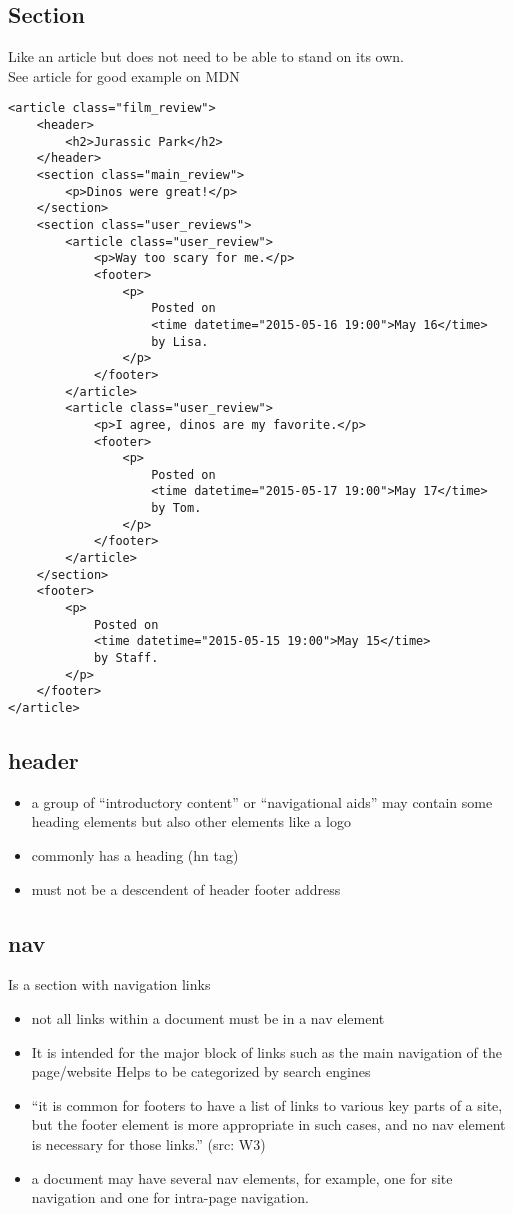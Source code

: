 \documentclass[]{article}
\newcommand{\<}{\guilsinglleft}
\renewcommand{\>}{\guilsinglright}
\begin{document}
\subsection{Section}
Like an article but does not need to be able to stand on its own.
\\
See article for good example on MDN
\begin{lstlisting}
<article class="film_review">
	<header>
		<h2>Jurassic Park</h2>
	</header>
	<section class="main_review">
		<p>Dinos were great!</p>
	</section>
	<section class="user_reviews">
		<article class="user_review">
			<p>Way too scary for me.</p>
			<footer>
				<p>
					Posted on
					<time datetime="2015-05-16 19:00">May 16</time>
					by Lisa.
				</p>
			</footer>
		</article>
		<article class="user_review">
			<p>I agree, dinos are my favorite.</p>
			<footer>
				<p>
					Posted on
					<time datetime="2015-05-17 19:00">May 17</time>
					by Tom.
				</p>
			</footer>
		</article>
	</section>
	<footer>
		<p>
			Posted on
			<time datetime="2015-05-15 19:00">May 15</time>
			by Staff.
		</p>
	</footer>
</article>
\end{lstlisting}

\subsection{header}
\begin{itemize}
	\item a group of “introductory content” or “navigational aids”
	\subitem may contain some heading elements but also other elements like a logo
	
	\item commonly has a heading (hn tag)
	
	\item must not be a descendent of 
	\subitem header
	\subitem footer
	\subitem address
\end{itemize}

\subsection{nav}
Is a section with navigation links
\begin{itemize}
	\item not all links within a document must be in a nav element
	
	\item It is intended for the major block of links
	\subitem such as the main navigation of the page/website
	\subitem Helps to be categorized by search engines
	
	\item “it is common for footers to have a list of links to various key parts of a site, but the footer element is more appropriate in such cases, and no nav element is necessary for those links.” (src: W3)
	
	\item a document may have several nav elements, for example, one for site navigation and one for intra-page navigation.
\end{itemize}
\end{document}
